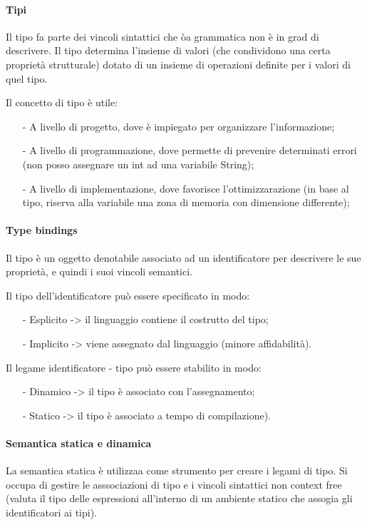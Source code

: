 \documentclass[a4paper, 10pt]{report}
\begin{document}
\paragraph*{Tipi} Il tipo fa parte dei vincoli sintattici che òa grammatica non è in grad di descrivere. Il tipo determina l'insieme di valori (che condividono una certa proprietà strutturale) dotato di un insieme di operazioni definite per i valori di quel tipo. 

\noindent Il concetto di tipo è utile:
\begin{itemize}
\item[-] A livello di progetto, dove è impiegato per organizzare l'informazione;
\item[-] A livello di programmazione, dove permette di prevenire determinati errori (non posso assegnare un int ad una variabile String);
\item[-] A livello di implementazione, dove favorisce l'ottimizzarazione (in base al tipo, riserva alla variabile una zona di memoria con dimensione differente);
\end{itemize}

\paragraph*{Type bindings} Il tipo è un oggetto denotabile associato ad un identificatore per descrivere le sue proprietà, e quindi i suoi vincoli semantici.

\noindent Il tipo dell'identificatore può essere specificato in modo:
\begin{itemize}
\item[-] Esplicito -> il linguaggio contiene il costrutto del tipo;
\item[-] Implicito -> viene assegnato dal linguaggio (minore affidabilità).
\end{itemize}

\noindent Il legame identificatore - tipo può essere stabilito in modo:
\begin{itemize}
\item[-] Dinamico -> il tipo è associato con l'assegnamento;
\item[-] Statico -> il tipo è associato a tempo di compilazione).
\end{itemize}

\paragraph*{Semantica statica e dinamica} La semantica statica è utilizzaa come strumento per creare i legami di tipo. Si occupa di gestire le asssociazioni di tipo e i vincoli sintattici non context free (valuta il tipo delle espressioni all'interno di un ambiente statico che assogia gli identificatori ai tipi).
\end{document}
